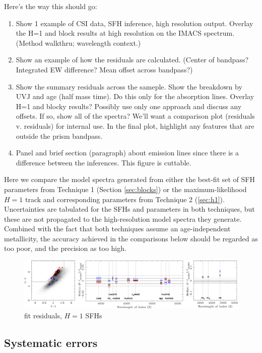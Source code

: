\documentclass[a4paper,fleqn,usenatbib]{mnras}
\newcommand{\benum}{\begin{enumerate}}
\newcommand{\eenum}{\end{enumerate}}
\begin{document}
Here's the way this should go:
\benum
	\item Show 1 example of CSI data, SFH inference, high resolution output. Overlay the H=1 and block
		results at high resolution on the IMACS spectrum. (Method walkthru; wavelength context.)
	\item Show an example of how the residuals are calculated. (Center of bandpass? Integrated EW
		difference? Mean offset across bandpass?)
	\item Show the summary residuals across the sameple. Show the breakdown by UVJ and age 
		(half mass time). 	Do this only for the absorption lines. Overlay H=1 and blocky results? Possibly use
		only one approach and discuss any offsets. If so, show all of the spectra? We'll want a comparison 
		plot (residuals v. residuals) for internal use. In the final plot, highlight any features that are 
		outside the 	prism bandpass.
	\item Panel and brief section (paragraph) about emission lines since there is a difference between
		the inferences. This figure is cuttable.
\eenum

Here we compare the model spectra generated from either the best-fit set of SFH parameters from 
Technique 1 (Section \ref{sec:blocks}) or the maximum-likelihood $H=1$ track and corresponding 
parameters from Technique 2 (\ref{sec:h1}). Uncertainties are tabulated for the SFHs and parameters 
in both techniques, but these are not propagated to the high-resolution model spectra they generate. 
Combined with the fact that both techniques assume an age-independent metallicity, the accuracy 
achieved in the comparisons below should be regarded as too poor, and the precision as too high.

\begin{figure}
\includegraphics[width = \textwidth]{residuals}
\caption{fit residuals, $H=1$ SFHs}
\label{fig:resids}
\end{figure}

\subsection{Systematic errors}
\label{sec:systematics}
\end{document}
